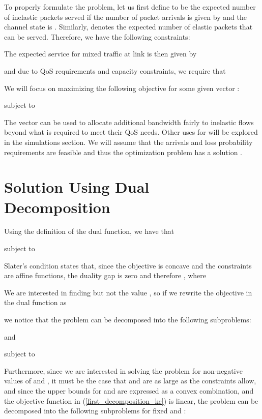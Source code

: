 \documentclass[conference]{IEEEtran}
\begin{document}
To properly formulate the problem, let us first define  to be the expected number of inelastic packets served if the number of packet arrivals is given by  and the channel state is . Similarly,  denotes the expected number of elastic packets that can be served. Therefore, we have the following constraints:



The expected service for mixed traffic at link  is then given by


and due to QoS requirements and capacity constraints, we require that


We will focus on maximizing the following objective for some given vector :

subject to









The vector  can be used to allocate additional bandwidth fairly to inelastic flows beyond what is required to meet their QoS needs. Other uses for  will be explored in the simulations section. We will assume that the arrivals and loss probability requirements are feasible and thus the optimization problem has a solution .

\section{Solution Using Dual Decomposition}
\label{decomposition_kc}

Using the definition of the dual function\cite{Luenberger03}, we have that 

subject to








Slater's condition \cite{Boyd04} states that, since the objective is concave and the constraints are affine functions, the duality gap is zero and therefore , where


We are interested in finding  but not the value , so if we rewrite the objective in the dual function as

we notice that the problem can be decomposed into the following subproblems:

and

subject to






Furthermore, since we are interested in solving the problem for non-negative values of  and , it must be the case that  and  are as large as the constraints allow, and since the upper bounds for  and  are expressed as a convex combination, and the objective function in (\ref{first_decomposition_kc}) is linear, the problem can be decomposed into the following subproblems for fixed  and :
\end{document}
